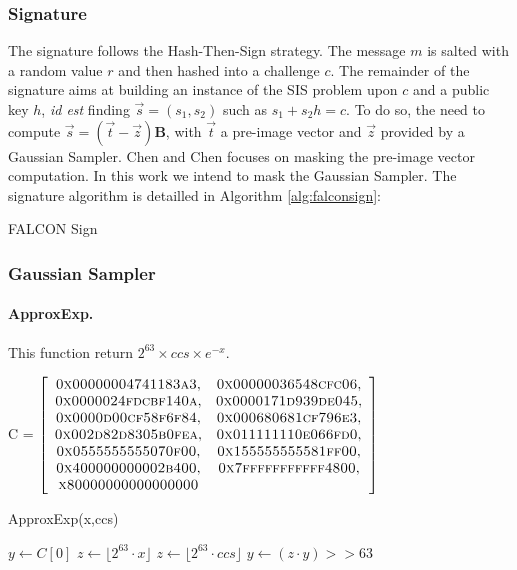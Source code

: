 \documentclass[runningheads]{llncs}
\begin{document}
\subsubsection{Signature} The signature follows the Hash-Then-Sign strategy. The message $m$ is salted with a random value $r$ and then hashed into a challenge $c$. The remainder of the signature aims at building an instance of the SIS problem upon $c$ and a public key $h$, \emph{id est} finding $\vec{s} =(s_1,s_2)$ such as $s_1 + s_2 h = c$. To do so, the need to compute $\vec{s} = (\vec{t}-\vec{z})\mathbf{B}$, with $\vec{t}$ a pre-image vector and $\vec{z}$ provided by a Gaussian Sampler. Chen and Chen \cite{Chen_Chen_2024} focuses on masking the pre-image vector computation. In this work we intend to mask the Gaussian Sampler. The signature algorithm is detailled in Algorithm \ref{alg:falconsign}:

\begin{algorithm}[H]
  \caption{FALCON Sign \cite{prest2020falcon}}
  \label{alg:falconsign}
\end{algorithm}

\subsubsection{Gaussian Sampler}

\paragraph{ApproxExp.} This function return $2^{63}\times ccs \times e^{-x}$.

C =
$ \left[\begin{array}{cc}
     \textsc{0x00000004741183a3}, & \textsc{0x00000036548cfc06},\\
        \textsc{0x0000024fdcbf140a},& \textsc{0x0000171d939de045},\\
     \textsc{0x0000d00cf58f6f84},& \textsc{0x000680681cf796e3},\\
     \textsc{0x002d82d8305b0fea},& \textsc{0x011111110e066fd0},\\
     \textsc{0x0555555555070f00},& \textsc{0x155555555581ff00},\\
    \textsc{0x400000000002b400},&\textsc{0x7fffffffffff4800}, \\
     \textsc{x80000000000000000}&
\end{array}\right]$

\begin{algorithm}
  \caption{ApproxExp(x,ccs) \cite{prest2020falcon}}
  \small
$y \leftarrow C[0]$ 
  $z \leftarrow \lfloor 2^{63}\cdot x\rfloor$\;
$z \leftarrow \lfloor 2^{63}\cdot ccs\rfloor$\;
$y\leftarrow (z\cdot y)>>63$\;
\;
\end{algorithm}
\end{document}
